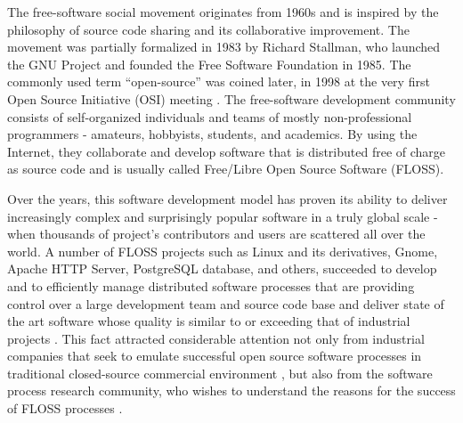 The free-software social movement originates from 1960s and is inspired by the philosophy of 
source code sharing and its collaborative improvement. The movement was partially formalized in 1983 
by Richard Stallman, who launched the GNU Project and founded the Free Software Foundation in 1985.
The commonly used term ``open-source'' was coined later, in 1998 at the very first Open Source 
Initiative (OSI) meeting \cite{osi-history}.
The free-software development community consists of self-organized individuals and teams of 
mostly non-professional programmers - amateurs, hobbyists, students, and academics. 
By using the Internet, they collaborate and develop software that is distributed free of charge as source code
and is usually called Free/Libre Open Source Software (FLOSS). 

Over the years, this software development model has proven its ability to deliver increasingly complex 
and surprisingly popular software in a truly global scale - when thousands of project's contributors 
and users are scattered all over the world. A number of FLOSS projects such as Linux and its 
derivatives, Gnome, Apache HTTP Server, PostgreSQL database, and others, succeeded to develop and to 
efficiently manage distributed software processes that are providing control over a large development 
team and source code base and deliver state of the art software whose quality is similar to or 
exceeding that of industrial projects \cite{coverity2012}. 
This fact attracted considerable attention not only from industrial companies that seek to emulate 
successful open source software processes in traditional closed-source commercial environment 
\cite{oss_virtual_organizations} \cite{oss_balance} \cite{oss_hp} \cite{oss_4industry}, 
but also from the software process research community, who wishes to understand the reasons for 
the success of FLOSS processes \cite{citeulike:12550640} \cite{citeulike:5043664} 
\cite{citeulike:5128808} \cite{citeulike:10377366} \cite{citeulike:342840}.



